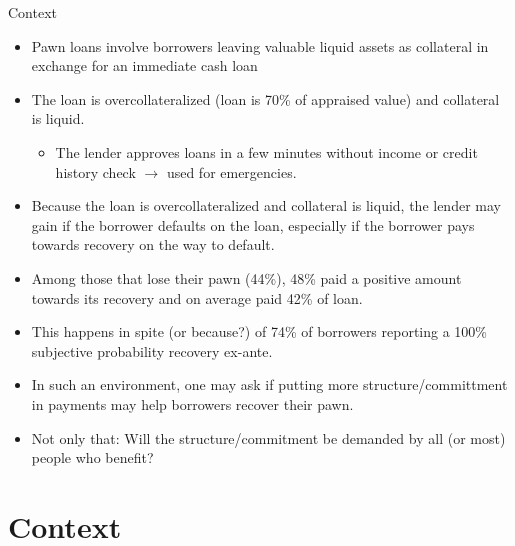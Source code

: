 \documentclass[8pt]{beamer}
\begin{document}
\begin{frame}{Context}
\begin{itemize}
     \item Pawn loans involve borrowers leaving valuable liquid assets as collateral in exchange for an immediate cash loan
     \item The loan is overcollateralized (loan is 70\% of appraised value) and collateral is liquid.
    \begin{itemize}
        \item The lender approves loans in a few minutes without income or credit history check $\rightarrow$ used for emergencies.
    \end{itemize}
  \item Because the loan is overcollateralized and collateral is liquid, the lender may gain if the borrower defaults on the loan, especially if the borrower pays towards recovery on the way to default.
     \item Among those that lose their pawn (44\%), 48\% paid a positive amount towards its recovery and on average paid 42\% of loan.
     \item This happens in spite (or because?) of 74\% of borrowers reporting a 100\% subjective probability recovery ex-ante. 
        \item In such an environment, one may ask if putting more structure/committment in payments may help borrowers recover their pawn.
      \item Not only that: Will the structure/commitment be demanded by all (or most) people who benefit?
        

\end{itemize}
\end{frame}


\section{Context}
\end{document}
